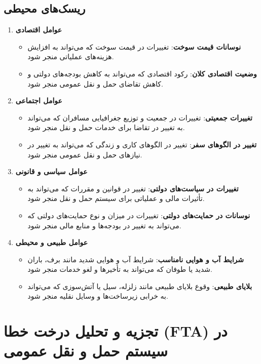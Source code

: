 \subsection{ریسک‌های محیطی}
\begin{enumerate}
	\item \textbf{عوامل اقتصادی}
	\begin{itemize}
		\item \textbf{نوسانات قیمت سوخت}: تغییرات در قیمت سوخت که می‌تواند به افزایش هزینه‌های عملیاتی منجر شود.
		\item \textbf{وضعیت اقتصادی کلان}: رکود اقتصادی که می‌تواند به کاهش بودجه‌های دولتی و کاهش تقاضای حمل و نقل عمومی منجر شود.
	\end{itemize}
	\item \textbf{عوامل اجتماعی}
	\begin{itemize}
		\item \textbf{تغییرات جمعیتی}: تغییرات در جمعیت و توزیع جغرافیایی مسافران که می‌تواند به تغییر در تقاضا برای خدمات حمل و نقل منجر شود.
		\item \textbf{تغییر در الگوهای سفر}: تغییر در الگوهای کاری و زندگی که می‌تواند به تغییر در نیازهای حمل و نقل عمومی منجر شود.
	\end{itemize}
	\item \textbf{عوامل سیاسی و قانونی}
	\begin{itemize}
		\item \textbf{تغییرات در سیاست‌های دولتی}: تغییر در قوانین و مقررات که می‌تواند به تأثیرات مالی و عملیاتی برای سیستم حمل و نقل منجر شود.
		\item \textbf{نوسانات در حمایت‌های دولتی}: تغییرات در میزان و نوع حمایت‌های دولتی که می‌تواند به تغییر در بودجه‌ها و منابع مالی منجر شود.
	\end{itemize}
	\item \textbf{عوامل طبیعی و محیطی}
	\begin{itemize}
		\item \textbf{شرایط آب و هوایی نامناسب}: شرایط آب و هوایی شدید مانند برف، باران شدید یا طوفان که می‌تواند به تأخیرها و لغو خدمات منجر شود.
		\item \textbf{بلایای طبیعی}: وقوع بلایای طبیعی مانند زلزله، سیل یا آتش‌سوزی که می‌تواند به خرابی زیرساخت‌ها و وسایل نقلیه منجر شود.
	\end{itemize}
\end{enumerate}


\section{تجزیه و تحلیل درخت خطا (FTA) در سیستم حمل و نقل عمومی}


